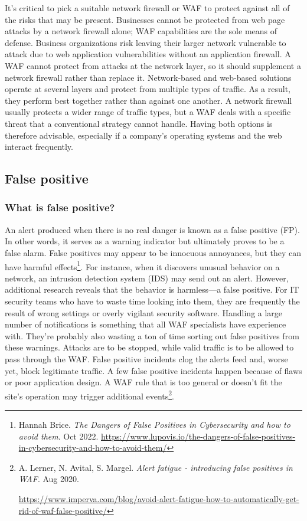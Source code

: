 It's critical to pick a suitable network firewall or WAF to protect against all of the risks that may be present. Businesses cannot be protected from web page attacks by a network firewall alone; WAF capabilities are the sole means of defense. Business organizations risk leaving their larger network vulnerable to attack due to web application vulnerabilities without an application firewall. A WAF cannot protect from attacks at the network layer, so it should supplement a network firewall rather than replace it. Network-based and web-based solutions operate at several layers and protect from multiple types of traffic. As a result, they perform best together rather than against one another. A network firewall usually protects a wider range of traffic types, but a WAF deals with a specific threat that a conventional strategy cannot handle. Having both options is therefore advisable, especially if a company's operating systems and the web interact frequently.
\subsection{False positive}
\subsubsection{What is false positive?}
\hspace{0.5cm}An alert produced when there is no real danger is known as a false positive (FP). In other words, it serves as a warning indicator but ultimately proves to be a false alarm. False positives may appear to be innocuous annoyances, but they can have harmful effects\footnote{Hannah Brice. \textit{The Dangers of False Positives in Cybersecurity and how to avoid them}. Oct 2022. 
\url{https://www.lupovis.io/the-dangers-of-false-positives-in-cybersecurity-and-how-to-avoid-them/}}.
For instance, when it discovers unusual behavior on a network, an intrusion detection system (IDS) may send out an alert. However, additional research reveals that the behavior is harmless—a false positive. For IT security teams who have to waste time looking into them, they are frequently the result of wrong settings or overly vigilant security software.
\newpage
Handling a large number of notifications is something that all WAF specialists have experience with. They're probably also wasting a ton of time sorting out false positives from these warnings. Attacks are to be stopped, while valid traffic is to be allowed to pass through the WAF. False positive incidents clog the alerts feed and, worse yet, block legitimate traffic. A few false positive incidents happen because of flaws or poor application design. A WAF rule that is too general or doesn't fit the site's operation may trigger additional events\footnote{A. Lerner, N. Avital, S. Margel. 
\textit{Alert fatigue - introducing false positives in WAF}. Aug 2020.
\raggedright\url{https://www.imperva.com/blog/avoid-alert-fatigue-how-to-automatically-get-rid-of-waf-false-positive/}}.

